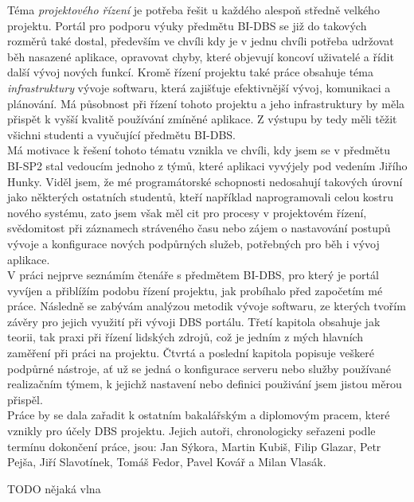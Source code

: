 Téma \emph{projektového řízení} je potřeba řešit u každého alespoň středně velkého projektu. Portál pro podporu výuky předmětu BI-DBS se již do takových rozměrů také dostal, především ve chvíli kdy je v jednu chvíli potřeba udržovat běh nasazené aplikace, opravovat chyby, které objevují koncoví uživatelé a řídit další vývoj nových funkcí. Kromě řízení projektu také práce obsahuje téma \emph{infrastruktury} vývoje softwaru, která zajišťuje efektivnější vývoj, komunikaci a plánování. Má působnost při řízení tohoto projektu a jeho infrastruktury by měla přispět k vyšší kvalitě používání zmíněné aplikace. Z výstupu by tedy měli těžit všichni studenti a vyučující předmětu BI-DBS.\\
Má motivace k řešení tohoto tématu vznikla ve chvíli, kdy jsem se v předmětu BI-SP2 stal vedoucím jednoho z týmů, které aplikaci vyvýjely pod vedením Jiřího Hunky. Viděl jsem, že mé programátorské schopnosti nedosahují takových úrovní jako některých ostatních studentů, kteří například naprogramovali celou kostru nového systému, zato jsem však měl cit pro procesy v projektovém řízení, svědomitost při záznamech stráveného času nebo zájem o nastavování postupů vývoje a konfigurace nových podpůrných služeb, potřebných pro běh i vývoj aplikace.\\
V práci nejprve seznámím čtenáře s předmětem BI-DBS, pro který je portál vyvíjen a přiblížím podobu řízení projektu, jak probíhalo před započetím mé práce. Následně se zabývám analýzou metodik vývoje softwaru, ze kterých tvořím závěry pro jejich využití při vývoji DBS portálu. Třetí kapitola obsahuje jak teorii, tak praxi při řízení lidských zdrojů, což je jedním z mých hlavních zaměření při práci na projektu. Čtvrtá a poslední kapitola popisuje veškeré podpůrné nástroje, ať už se jedná o konfigurace serveru nebo služby používané realizačním týmem, k jejichž nastavení nebo definici použivání jsem jistou měrou přispěl.\\
Práce by se dala zařadit k ostatním bakalářským a diplomovým pracem, které vznikly pro účely DBS projektu. Jejich autoři, chronologicky seřazeni podle termínu dokončení práce, jsou: Jan Sýkora, Martin Kubiš, Filip Glazar, Petr Pejša, Jiří Slavotínek, Tomáš Fedor, Pavel Kovář a Milan Vlasák.

TODO nějaká vlna
